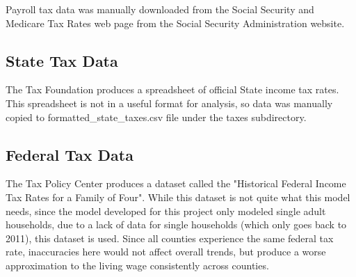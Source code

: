Payroll tax data was manually downloaded from the Social Security and Medicare Tax Rates web page from the Social Security Administration website. \cite{ssa} 

\subsection{State Tax Data}

The Tax Foundation produces a spreadsheet of official State income tax rates. This spreadsheet is not in a useful format for analysis, so data was manually copied to formatted\_state\_taxes.csv file under the taxes subdirectory. \cite{state_tax}

\subsection{Federal Tax Data}

The Tax Policy Center produces a dataset called the "Historical Federal Income Tax Rates for a Family of Four". While this dataset is not quite what this model needs, since the model developed for this project only modeled single adult households, due to a lack of data for single households (which only goes back to 2011), this dataset is used. \cite{federal_tax} Since all counties experience the same federal tax rate, inaccuracies here would not affect overall trends, but produce a worse approximation to the living wage consistently across counties.